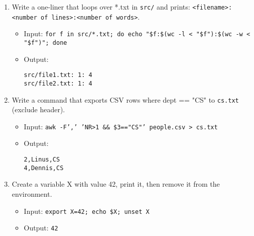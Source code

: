 \begin{enumerate}
\item Write a one-liner that loops over *.txt in \texttt{src/} and prints: \texttt{<filename>:<number of lines>:<number of words>}.
\begin{itemize}
\item Input: \texttt{for f in src/*.txt; do echo "\$f:\$(wc -l < "\$f"):\$(wc -w < "\$f")"; done}
\item Output:
\begin{verbatim}
src/file1.txt: 1: 4
src/file2.txt: 1: 4
\end{verbatim}
\end{itemize}

\item Write a command that exports CSV rows where dept == "CS" to \texttt{cs.txt} (exclude header).
\begin{itemize}
\item Input: \texttt{awk -F',' 'NR>1 \&\& \$3=="CS"' people.csv > cs.txt}
\item Output:
\begin{verbatim}
2,Linus,CS
4,Dennis,CS
\end{verbatim}
\end{itemize}

\item Create a variable X with value 42, print it, then remove it from the environment.
\begin{itemize}
\item Input: \texttt{export X=42; echo \$X; unset X}
\item Output: \texttt{42}
\end{itemize}
\end{enumerate}